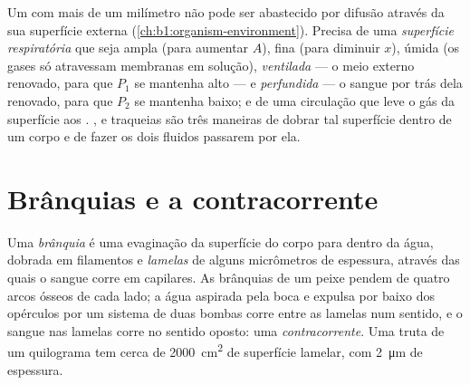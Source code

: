 \begin{proposition}\label{prop:b1:gas-exchange:requirements}
Um  com mais de um milímetro não pode ser abastecido por
difusão através da sua superfície externa
(\cref{ch:b1:organism-environment}). Precisa de uma \emph{superfície
respiratória} que seja ampla (para aumentar $A$), fina (para diminuir
$x$), úmida (os gases só atravessam membranas em solução),
\emph{ventilada} --- o meio externo renovado, para que $P_1$ se
mantenha alto --- e \emph{perfundida} --- o sangue por trás dela
renovado, para que $P_2$ se mantenha baixo; e de uma circulação que
leve o gás da superfície aos . ,  e traqueias
são três maneiras de dobrar tal superfície dentro de um corpo e de
fazer os dois fluidos passarem por ela.
\end{proposition}

\section{Brânquias e a contracorrente}

\begin{definition}[Brânquia]\label{def:b1:gas-exchange:gill}
Uma \emph{brânquia} é uma evaginação da superfície do corpo para
dentro da água, dobrada em filamentos e \emph{lamelas} de alguns
micrômetros de espessura, através das quais o sangue corre em
capilares. As brânquias de um peixe pendem de quatro arcos ósseos de
cada lado; a água aspirada pela boca e expulsa por baixo dos opérculos
por um sistema de duas bombas corre entre as lamelas num sentido, e o
sangue nas lamelas corre no sentido oposto: uma
\emph{contracorrente}.
Uma truta de um quilograma tem cerca de \qty{2000}{cm^2} de superfície
lamelar, com \qty{2}{\micro m} de espessura.
\end{definition}


